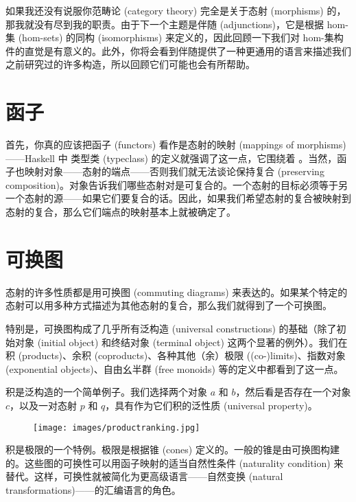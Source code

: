 
\lettrine[lhang=0.17]{如}{果我还没有}说服你范畴论 (category theory) 完全是关于态射 (morphisms) 的，那我就没有尽到我的职责。由于下一个主题是伴随 (adjunctions)，它是根据 hom-集 (hom-sets) 的同构 (isomorphisms) 来定义的，因此回顾一下我们对 hom-集构件的直觉是有意义的。此外，你将会看到伴随提供了一种更通用的语言来描述我们之前研究过的许多构造，所以回顾它们可能也会有所帮助。

\section{函子}

首先，你真的应该把函子 (functors) 看作是态射的映射 (mappings of morphisms)——Haskell 中  类型类 (typeclass) 的定义就强调了这一点，它围绕着 。当然，函子也映射对象——态射的端点——否则我们就无法谈论保持复合 (preserving composition)。对象告诉我们哪些态射对是可复合的。一个态射的目标必须等于另一个态射的源——如果它们要复合的话。因此，如果我们希望态射的复合被映射到  态射的复合，那么它们端点的映射基本上就被确定了。

\section{可换图}

态射的许多性质都是用可换图 (commuting diagrams) 来表达的。如果某个特定的态射可以用多种方式描述为其他态射的复合，那么我们就得到了一个可换图。

特别是，可换图构成了几乎所有泛构造 (universal constructions) 的基础（除了初始对象 (initial object) 和终结对象 (terminal object) 这两个显著的例外）。我们在积 (products)、余积 (coproducts)、各种其他（余）极限 ((co-)limits)、指数对象 (exponential objects)、自由幺半群 (free monoids) 等的定义中都看到了这一点。

积是泛构造的一个简单例子。我们选择两个对象 $a$ 和 $b$，然后看是否存在一个对象 $c$，以及一对态射 $p$ 和 $q$，具有作为它们积的泛性质 (universal property)。

\begin{figure}[H]
  \centering
  \texttt{[image: images/productranking.jpg]}
\end{figure}

\noindent
积是极限的一个特例。极限是根据锥 (cones) 定义的。一般的锥是由可换图构建的。这些图的可换性可以用函子映射的适当自然性条件 (naturality condition) 来替代。这样，可换性就被简化为更高级语言——自然变换 (natural transformations)——的汇编语言的角色。

